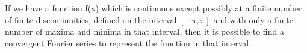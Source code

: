 If we have a function f(x) which is continuous except possibly at
a finite number of finite discontinuities, defined on the interval
$ [ - \pi , \pi ] $ 
and with only a finite number of maxima and minima in that interval,
then it is possible to find a convergent Fourier series to
represent the function in that interval.
